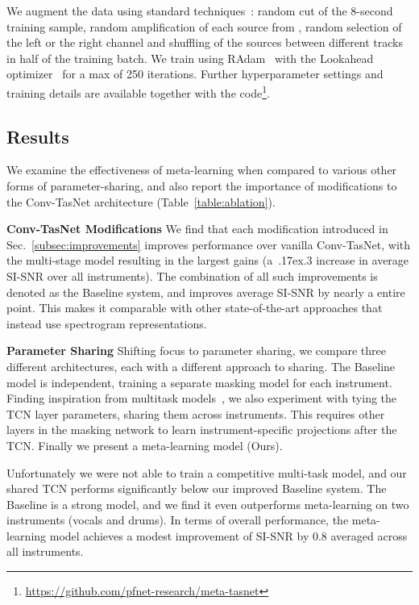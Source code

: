 \documentclass{article}
\begin{document}
We augment the data using standard techniques~\cite{dataAugmentation}: random cut of the 8-second training sample, random amplification of each source from , random selection of the left or the right channel and shuffling of the sources between different tracks in half of the training batch.  We train using RAdam~\cite{liu2019radam} with the Lookahead optimizer~\cite{zhang2019lookahead} for a max of 250 iterations. Further hyperparameter settings and training details are available together with the code\footnote{\url{https://github.com/pfnet-research/meta-tasnet}}. 



\subsection{Results}

We examine the effectiveness of meta-learning when compared to various other forms of parameter-sharing, and also report the importance of modifications to the Conv-TasNet architecture (Table~\ref{table:ablation}).

\noindent \textbf{Conv-TasNet Modifications} We find that each modification introduced in Sec.~\ref{subsec:improvements} improves performance over vanilla Conv-TasNet, with the multi-stage model resulting in the largest gains (a~{\raise.17ex\hbox{}}.3 increase in average SI-SNR over all instruments).  The combination of all such improvements is denoted as the Baseline system, and improves average SI-SNR by nearly a entire point.  This makes it comparable with other state-of-the-art approaches that instead use spectrogram representations.

\noindent \textbf{Parameter Sharing} Shifting focus to parameter sharing, we compare three different architectures, each with a different approach to sharing.  The Baseline model is independent, training a separate masking model for each instrument.  Finding inspiration from multitask models~\cite{hyperface}, we also experiment with tying the TCN layer parameters, sharing them across instruments. This requires other layers in the masking network to learn instrument-specific projections after the TCN.  Finally we present a meta-learning model (Ours). 

Unfortunately we were not able to train a competitive multi-task model, and our shared TCN performs significantly below our improved Baseline system.  The Baseline is a strong model, and we find it even outperforms meta-learning on two instruments (vocals and drums).  In terms of overall performance, the meta-learning model achieves a modest improvement of SI-SNR by 0.8 averaged across all instruments.
\end{document}
